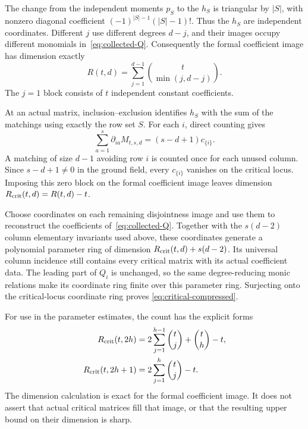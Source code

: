 The change from the independent moments $p_S$ to the $h_S$ is
triangular by $|S|$, with nonzero diagonal coefficient
$(-1)^{|S|-1}(|S|-1)!$. Thus the $h_S$ are independent coordinates.
Different $j$ use different degrees $d-j$, and their images occupy
different monomials in~\eqref{eq:collected-Q}. Consequently the
formal coefficient image has dimension exactly
\[
 R(t,d)=\sum_{j=1}^{d-1}\binom t{\min(j,d-j)}.
\]
The $j=1$ block consists of $t$ independent constant coefficients.

At an actual matrix, inclusion--exclusion identifies $h_S$ with the
sum of the matchings using exactly the row set $S$. For each $i$,
direct counting gives
\begin{equation}\label{eq:constant-block}
 \sum_{a=1}^s\partial_{ia}M_{t,s,d}=(s-d+1)c_{\{i\}}.
\end{equation}
A matching of size $d-1$ avoiding row $i$ is counted once for each
unused column. Since $s-d+1\ne0$ in the ground field, every
$c_{\{i\}}$ vanishes on the critical locus. Imposing this zero
block on the formal coefficient image leaves dimension
$R_{\rm crit}(t,d)=R(t,d)-t$.

Choose coordinates on each remaining disjointness image and use
them to reconstruct the coefficients of~\eqref{eq:collected-Q}.
Together with the $s(d-2)$ column elementary invariants used above,
these coordinates generate a polynomial parameter ring of dimension
$R_{\rm crit}(t,d)+s(d-2)$. Its universal column incidence still
contains every critical matrix with its actual coefficient data.
The leading part of $Q_i$ is unchanged, so the same degree-reducing
monic relations make its coordinate ring finite over this parameter
ring. Surjecting onto the critical-locus coordinate ring proves
\eqref{eq:critical-compressed}.

For use in the parameter estimates, the count has the explicit forms
\[
 \begin{split}
 R_{\rm crit}(t,2h)&=2\sum_{j=1}^{h-1}\binom tj+\binom th-t,\\
 R_{\rm crit}(t,2h+1)&=2\sum_{j=1}^{h}\binom tj-t.
 \end{split}
\]
The dimension calculation is exact for the formal coefficient image.
It does not assert that actual critical matrices fill that image,
or that the resulting upper bound on their dimension is sharp.
